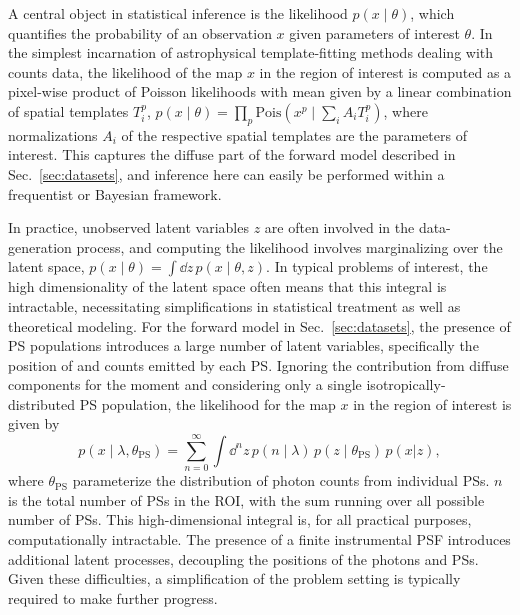 \documentclass[prd,aps,10pt,nofootinbib,twocolumn,superscriptaddress,preprintnumbers,balancelastpage,longbibliography]{revtex4-1}
\begin{document}
A central object in statistical inference is the likelihood $p(x\mid \theta)$, which quantifies the probability of an observation $x$ given parameters of interest $\theta$. In the simplest incarnation of astrophysical template-fitting methods dealing with counts data, the likelihood of the map $x$ in the region of interest is computed as a pixel-wise product of Poisson likelihoods with mean given by a linear combination of spatial templates $T_i^p$, $p(x\mid \theta) = \prod_p \mathrm{Pois}\left(x^p\mid\sum_i A_i T_i^p\right)$, where normalizations $A_i$ of the respective spatial templates are the parameters of interest. This captures the diffuse part of the forward model described in Sec.~\ref{sec:datasets}, and inference here can easily be performed within a frequentist or Bayesian framework. 

In practice, unobserved latent variables $z$ are often involved in the data-generation process, and computing the likelihood involves marginalizing over the latent space, $p(x\mid\theta) = \int \dd z\,p(x\mid\theta, z)$. In typical problems of interest, the high dimensionality of the latent space often means that this integral is intractable, necessitating simplifications in statistical treatment as well as theoretical modeling. 
For the forward model in Sec.~\ref{sec:datasets}, the presence of PS populations 
introduces a large number of latent variables, specifically the position of and counts emitted by each PS. Ignoring the contribution from diffuse components for the moment and considering only a single isotropically-distributed PS population, the likelihood for the map $x$ in the region of interest is given by
\begin{equation}
\label{eq:data_likelihood}
p(x\mid\lambda, \theta_\mathrm{PS}) = \sum_{n = 0}^{\infty} \int \dd^{n} z \, p\left(n\mid\lambda\right)\,p(z\mid\theta_\mathrm{PS})\,p(x|z),
\end{equation}
where $\theta_\mathrm{PS}$ parameterize the distribution of photon counts from individual PSs. $n$ is the total number of PSs in the ROI, with the sum running over all possible number of PSs. This high-dimensional integral is, for all practical purposes, computationally intractable. The presence of a finite instrumental PSF introduces additional latent processes, decoupling the positions of the photons and PSs. Given these difficulties, a simplification of the problem setting is typically required to make further progress.
\end{document}
